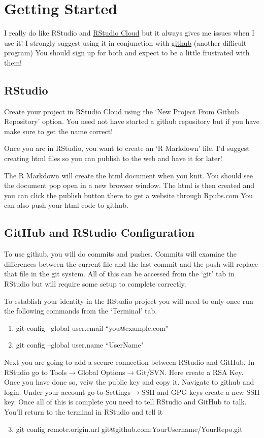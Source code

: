\documentclass{exam}
\begin{document}
\section{Getting Started}
I really do like RStudio and \href{https://RStudio.cloud}{RStudio Cloud} but it always gives me issues when I use it!
I strongly suggest using it in conjunction with \href{https:\\github.com}{github} (another difficult program)
You should sign up for both and expect to be a little frustrated with them!

\subsection{RStudio}
Create your project in RStudio Cloud using the `New Project From Github Repository' option.  You need not have started a github repository but if you have make sure to get the name correct!

Once you are in RStudio, you want to create an `R Markdown' file.  I'd suggest creating html files so you can publish to the web and have it for later!

The R Markdown will create the html document when you knit.  You should see the document pop open in a new browser window.  The html is then created and you can click the publish button there to get a website through Rpubs.com  You can also push your html code to github. 

\subsection{GitHub and RStudio Configuration}
To use github, you will do commits and pushes.  Commits will examine the differences between the current file and the last commit and the push will replace that file in the git system.  All of this can be accessed from the `git' tab in RStudio but will require some setup to complete correctly.

To establish your identity in the RStudio project you will need to only once run the following commands from the `Terminal' tab.
\begin{enumerate}
\item git config --global user.email ``you@example.com"
\item git config --global user.name ``UserName"
\end{enumerate}

Next you are going to add a secure connection between RStudio and GitHub.  In RStudio go to Tools$ \to$Global Options$\to$Git/SVN.  Here create a RSA Key.  Once you have done so, veiw the public key and copy it.  Navigate to github and login.  Under your account go to Settings$\to$SSH and GPG keys create a new SSH key.  Once all of this is complete you need to tell RStudio and GitHub to talk.  You\rq{}ll return to the terminal in RStudio and tell it
\begin{enumerate}
\setcounter{enumi}{2}
\item git config remote.origin.url git@github.com:YourUsername/YourRepo.git
\end{enumerate}
\end{document}

